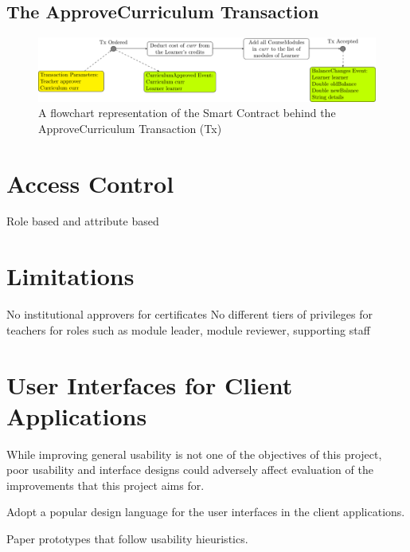 \subsection{The ApproveCurriculum Transaction}

\begin{figure}[!ht]
    \centering
    \includegraphics[width=1.0\textwidth]{actx}    
    \caption{A flowchart representation of the Smart Contract behind the ApproveCurriculum Transaction (Tx)} \label{fig:actx}
\end{figure}

\section{Access Control}
Role based and attribute based

\section{Limitations}
No institutional approvers for certificates
No different tiers of privileges for teachers for roles such as module leader, module reviewer, supporting staff

\section{User Interfaces for Client Applications}

While improving general usability is not one of the objectives of this project, poor usability and interface designs 
could adversely affect evaluation of the improvements that this project aims for.

Adopt a popular design language for the user interfaces in the client applications.

Paper prototypes that follow usability hieuristics.
